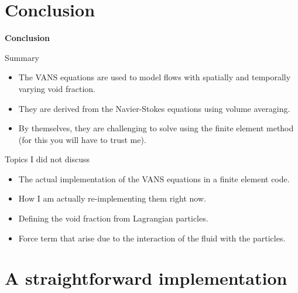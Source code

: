 \documentclass[c,11pt,xcolor=dvipsnames, aspectratio=169]{beamer}
\begin{document}
\section{Conclusion}
\begin{frame}{\textbf{Conclusion}}
\begin{block}{Summary}
	\begin{itemize}
		\item The VANS equations are used to model flows with spatially and temporally varying void fraction.
		\item They are derived from the Navier-Stokes equations using volume averaging.
		\item By themselves, they are challenging to solve using the finite element method (for this you will have to trust me).
	\end{itemize}
\end{block}
\begin{block}{Topics I did not discuss}
	\begin{itemize}
		\item The actual implementation of the VANS equations in a finite element code.
		\item How I am actually re-implementing them right now.
		\item Defining the void fraction from Lagrangian particles.
		\item Force term that arise due to the interaction of the fluid with the particles.
	\end{itemize}
\end{block}
\end{frame}


\section{A straightforward implementation}
\end{document}
